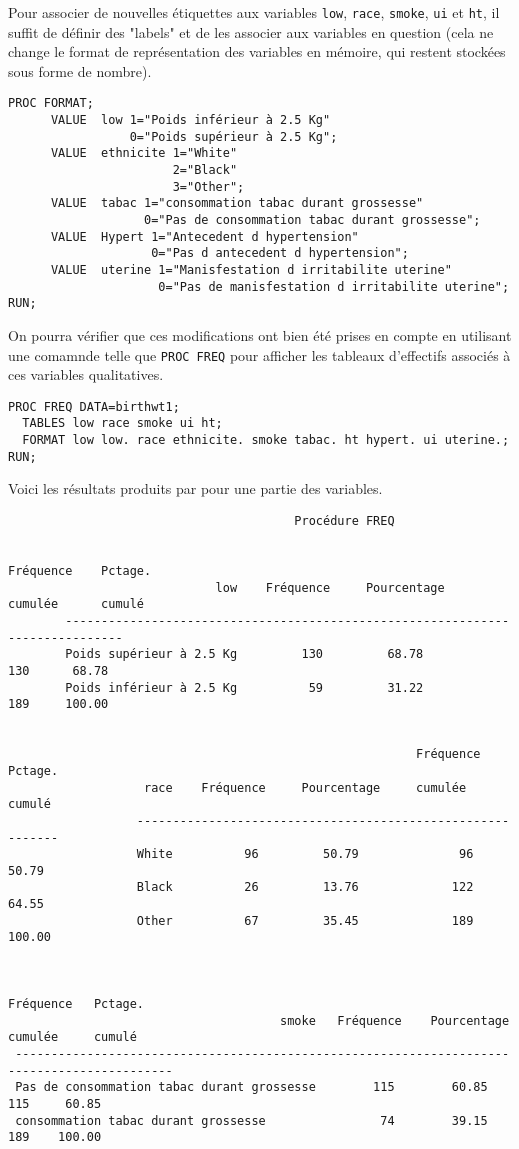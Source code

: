 Pour associer de nouvelles étiquettes aux variables \texttt{low},
\texttt{race}, \texttt{smoke}, \texttt{ui} et \texttt{ht}, il suffit de
définir des "labels" et de les associer aux variables en question (cela ne
change le format de représentation des variables en mémoire, qui restent
stockées sous forme de nombre).
\begin{verbatim}
PROC FORMAT;
      VALUE  low 1="Poids inférieur à 2.5 Kg"
                 0="Poids supérieur à 2.5 Kg";
      VALUE  ethnicite 1="White"
                       2="Black"
                       3="Other";
      VALUE  tabac 1="consommation tabac durant grossesse"
                   0="Pas de consommation tabac durant grossesse";
      VALUE  Hypert 1="Antecedent d hypertension"
                    0="Pas d antecedent d hypertension";
      VALUE  uterine 1="Manisfestation d irritabilite uterine"
                     0="Pas de manisfestation d irritabilite uterine";
RUN;
\end{verbatim}
On pourra vérifier que ces modifications ont bien été prises en compte en
utilisant une comamnde telle que \texttt{PROC FREQ} pour afficher les
tableaux d'effectifs associés à ces variables qualitatives.
\begin{verbatim}
PROC FREQ DATA=birthwt1; 
  TABLES low race smoke ui ht;
  FORMAT low low. race ethnicite. smoke tabac. ht hypert. ui uterine.;
RUN;
\end{verbatim}
Voici les résultats produits par \SAS pour une partie des variables.
\begin{verbatim}
                                        Procédure FREQ

                                                                  Fréquence    Pctage.
                             low    Fréquence     Pourcentage     cumulée      cumulé
        ------------------------------------------------------------------------------
        Poids supérieur à 2.5 Kg         130         68.78             130      68.78
        Poids inférieur à 2.5 Kg          59         31.22             189     100.00


                                                         Fréquence    Pctage.
                   race    Fréquence     Pourcentage     cumulée      cumulé
                  -----------------------------------------------------------
                  White          96         50.79              96      50.79
                  Black          26         13.76             122      64.55
                  Other          67         35.45             189     100.00


                                                                          Fréquence   Pctage.
                                      smoke   Fréquence    Pourcentage    cumulée     cumulé
 --------------------------------------------------------------------------------------------
 Pas de consommation tabac durant grossesse        115        60.85            115     60.85
 consommation tabac durant grossesse                74        39.15            189    100.00
\end{verbatim}


